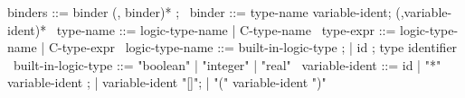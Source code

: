 \begin{syntax}
  binders ::= binder (, binder)* ;
  \
  binder ::= type-name variable-ident;
             (,variable-ident)*
  \
  type-name ::= logic-type-name | C-type-name
  \
  type-expr ::= logic-type-name | C-type-expr
  \
  logic-type-name ::= built-in-logic-type ;
  | id ; type identifier
  \
  built-in-logic-type ::= "boolean" | "integer" | "real"
  \
  variable-ident ::= id
  | "*" variable-ident ;
  | variable-ident "[]";
  | "(" variable-ident ")"
\end{syntax}
